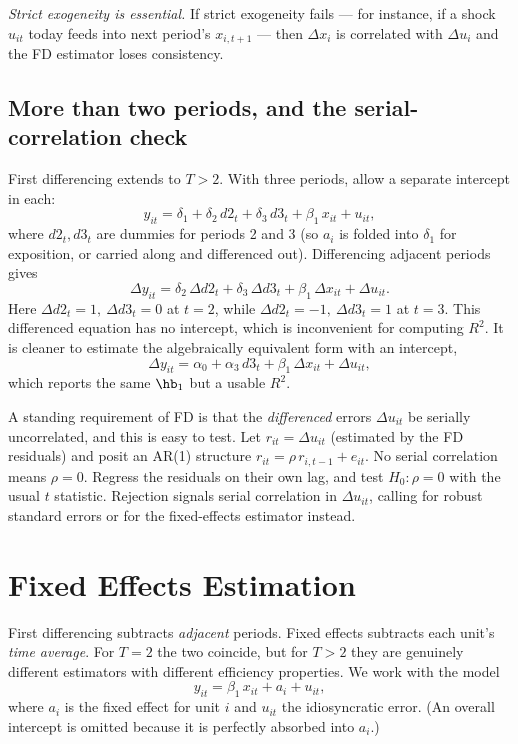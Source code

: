 \emph{Strict exogeneity is essential.} If strict exogeneity fails --- for instance, if a shock $u_{it}$ today feeds into next period's $x_{i,t+1}$ --- then $\Delta x_i$ is correlated with $\Delta u_i$ and the FD estimator loses consistency.

\subsection{More than two periods, and the serial-correlation check}

First differencing extends to $T>2$. With three periods, allow a separate intercept in each:
\[
y_{it} = \delta_1 + \delta_2\, d2_t + \delta_3\, d3_t + \beta_1\, x_{it} + u_{it},
\]
where $d2_t,d3_t$ are dummies for periods 2 and 3 (so $a_i$ is folded into $\delta_1$ for exposition, or carried along and differenced out). Differencing adjacent periods gives
\[
\Delta y_{it} = \delta_2\,\Delta d2_t + \delta_3\,\Delta d3_t + \beta_1\,\Delta x_{it} + \Delta u_{it}.
\]
Here $\Delta d2_t=1,\ \Delta d3_t=0$ at $t=2$, while $\Delta d2_t=-1,\ \Delta d3_t=1$ at $t=3$. This differenced equation has no intercept, which is inconvenient for computing $R^2$. It is cleaner to estimate the algebraically equivalent form with an intercept,
\[
\Delta y_{it} = \alpha_0 + \alpha_3\, d3_t + \beta_1\,\Delta x_{it} + \Delta u_{it},
\]
which reports the same $\hb_1$ but a usable $R^2$.

A standing requirement of FD is that the \emph{differenced} errors $\Delta u_{it}$ be serially uncorrelated, and this is easy to test. Let $r_{it}=\Delta u_{it}$ (estimated by the FD residuals) and posit an AR(1) structure $r_{it}=\rho\, r_{i,t-1}+e_{it}$. No serial correlation means $\rho=0$. Regress the residuals on their own lag, and test $H_0:\rho=0$ with the usual $t$ statistic. Rejection signals serial correlation in $\Delta u_{it}$, calling for robust standard errors or for the fixed-effects estimator instead.

\section{Fixed Effects Estimation}
\label{sec:fe}

First differencing subtracts \emph{adjacent} periods. Fixed effects subtracts each unit's \emph{time average}. For $T=2$ the two coincide, but for $T>2$ they are genuinely different estimators with different efficiency properties. We work with the model
\[
y_{it} = \beta_1\, x_{it} + a_i + u_{it},
\]
where $a_i$ is the fixed effect for unit $i$ and $u_{it}$ the idiosyncratic error. (An overall intercept is omitted because it is perfectly absorbed into $a_i$.)

